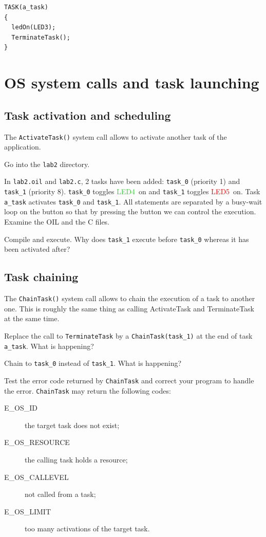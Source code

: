 \documentclass[11pt]{article}
\newcommand{\LEDgreen}{\textcolor{LimeGreen}{LED4}}
\newcommand{\LEDred}{\textcolor{red}{LED5}}
\begin{document}
\begin{lstlisting}
TASK(a_task)
{
  ledOn(LED3);
  TerminateTask();
}
\end{lstlisting}

\section{OS system calls and task launching}

\subsection{Task activation and scheduling}


The \texttt{ActivateTask()} system call allows to activate another task of the application.

Go into the \texttt{lab2} directory.

In \texttt{lab2.oil} and \texttt{lab2.c}, 2 tasks have been added: \texttt{task_0} (priority 1) and \texttt{task_1} (priority 8). \texttt{task_0} toggles \LEDgreen\ on and \texttt{task_1} toggles \LEDred\ on. Task \texttt{a_task} activates \texttt{task_0} and \texttt{task_1}. All statements are separated by a busy-wait loop on the button so that by pressing the button we can control the execution. Examine the OIL and the C files.

Compile and execute. Why does \texttt{task_1} execute before \texttt{task_0} whereas it has been activated after?

\subsection{Task chaining}

The \texttt{ChainTask()} system call allows to chain the execution of a task to another one. This is roughly the same thing as calling ActivateTask and TerminateTask at the same time.

Replace the call to \texttt{TerminateTask} by a \texttt{ChainTask(task_1)} at the end of task \texttt{a_task}. What is happening?

Chain to \texttt{task_0} instead of \texttt{task_1}. What is happening?

Test the error code returned by \texttt{ChainTask} and correct your program to
handle the error. \texttt{ChainTask} may return the following codes:

\begin{description}
\item[E_OS_ID] the target task does not exist;
\item[E_OS_RESOURCE] the calling task holds a resource;
\item[E_OS_CALLEVEL] not called from a task;
\item[E_OS_LIMIT] too many activations of the target task.
\end{description}
\end{document}
